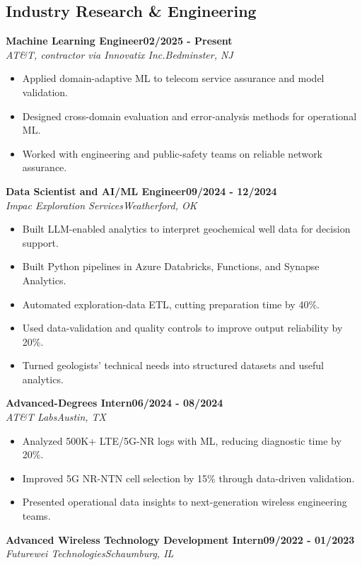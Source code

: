 \documentclass[9pt,letterpaper]{extarticle}
\newcommand{\role}[4]{%
  \Needspace{4\baselineskip}\textbf{#1}\hfill\textbf{#2}\\[-1pt]
  \textit{#3}\hfill\textit{#4}\par}
\begin{document}
\subsection{Industry Research \& Engineering}
\role{Machine Learning Engineer}{02/2025 - Present}{AT\&T, contractor via Innovatix Inc.}{Bedminster, NJ}
\begin{itemize}
\item Applied domain-adaptive ML to telecom service assurance and model validation.
\item Designed cross-domain evaluation and error-analysis methods for operational ML.
\item Worked with engineering and public-safety teams on reliable network assurance.
\end{itemize}
\vspace{1pt}
\role{Data Scientist and AI/ML Engineer}{09/2024 - 12/2024}{Impac Exploration Services}{Weatherford, OK}
\begin{itemize}
\item Built LLM-enabled analytics to interpret geochemical well data for decision support.
\item Built Python pipelines in Azure Databricks, Functions, and Synapse Analytics.
\item Automated exploration-data ETL, cutting preparation time by 40\%.
\item Used data-validation and quality controls to improve output reliability by 20\%.
\item Turned geologists' technical needs into structured datasets and useful analytics.
\end{itemize}
\vspace{1pt}
\role{Advanced-Degrees Intern}{06/2024 - 08/2024}{AT\&T Labs}{Austin, TX}
\begin{itemize}
\item Analyzed 500K+ LTE/5G-NR logs with ML, reducing diagnostic time by 20\%.
\item Improved 5G NR-NTN cell selection by 15\% through data-driven validation.
\item Presented operational data insights to next-generation wireless engineering teams.
\end{itemize}
\vspace{1pt}
\role{Advanced Wireless Technology Development Intern}{09/2022 - 01/2023}{Futurewei Technologies}{Schaumburg, IL}
\end{document}
